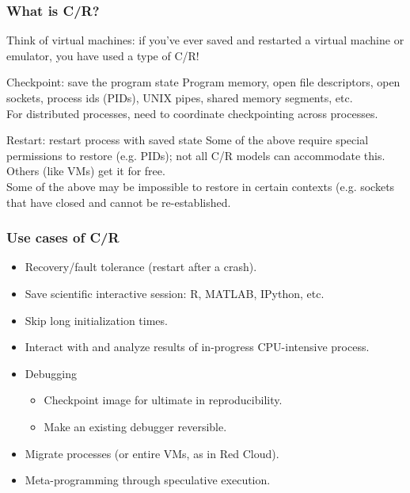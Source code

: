 \documentclass[compress]{beamer}
\begin{document}
\begin{frame}
\frametitle{What is C/R?}

Think of virtual machines: if you've ever saved and restarted a virtual machine
or emulator, you have used a type of C/R!

\begin{block}{Checkpoint: save the program state}
  Program memory, open file descriptors, open sockets, process ids (PIDs), UNIX pipes,
  shared memory segments, etc.\\
\vspace{1ex}
For distributed processes, need to coordinate checkpointing across processes.\\
\end{block}

\begin{block}{Restart: restart process with saved state}
  Some of the above require special permissions to restore (e.g. PIDs); not all
  C/R models can accommodate this. Others (like VMs) get it for free.\\
\vspace{1ex}
  Some of the above may be impossible to restore in certain contexts (e.g. sockets
  that have closed and cannot be re-established.\\
\end{block}


\end{frame}
  


\begin{frame}
\frametitle{Use cases of C/R}

\begin{itemize}
  \item{Recovery/fault tolerance (restart after a crash).}
  \item{Save scientific interactive session: R, MATLAB, IPython, etc.}
  \item{Skip long initialization times.}
  \item{Interact with and analyze results of in-progress CPU-intensive process.}
  \item{Debugging}
    \begin{itemize}
    \item{Checkpoint image for ultimate in reproducibility.}
    \item{Make an existing debugger reversible.}
    \end{itemize}
  \item{Migrate processes (or entire VMs, as in Red Cloud).}
  \item{Meta-programming through speculative execution.}
\end{itemize}
    
\end{frame}
\end{document}

